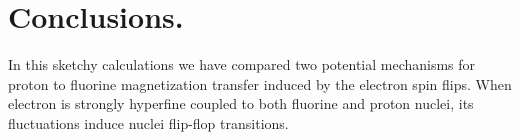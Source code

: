 \documentclass[a4paper, 12pt]{article}
\begin{document}

\section{Conclusions.}
In this sketchy calculations we have compared two potential mechanisms for proton to fluorine magnetization transfer induced by the electron spin flips. When electron is strongly hyperfine coupled to both fluorine and proton nuclei, its fluctuations induce nuclei flip-flop transitions.
\end{document}
